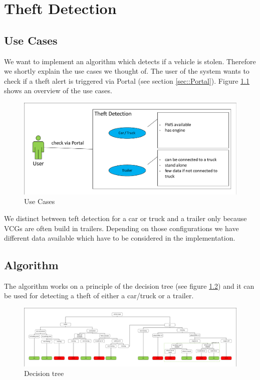 \chapter{Theft Detection}

\section{Use Cases}

We want to implement an algorithm which detects if a vehicle is stolen. Therefore we shortly explain the use cases we thought of. The user of the system wants to check if a theft alert is triggered via Portal (see section \ref{sec::Portal}). 
Figure \ref{fig::useCase} shows an overview of the use cases.

\begin{figure} [h]
    \includegraphics[clip, trim=0.1cm 0.1cm 0.1cm 0.1cm, width=1\textwidth]{src/pic/UseCase}
    \caption{Use Cases}
    \label{fig::useCase}
\end{figure}

We distinct between teft detection for a car or truck and a trailer only because VCGs are often build in trailers. Depending on those configurations we have different data available which have to be considered in the implementation.

\clearpage

\section{Algorithm}
The algorithm works on a principle of the decision tree (see figure \ref{fig::decisionTree}) and it can be used for detecting a theft of either a car/truck or a trailer.

\begin{figure} [h]
    \includegraphics[clip, trim=0.1cm 0.1cm 0.1cm 0.1cm, width=1\textwidth]{src/pic/DecisionTree}
    \caption{Decision tree}
    \label{fig::decisionTree}
\end{figure}

